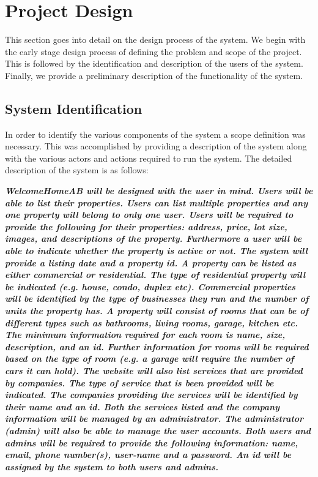 \documentclass[12pt,a4paper]{report}
\begin{document}
\section{Project Design} 
This section goes into detail on the design process of the system. We begin with the early stage design process of defining the problem and scope of the project. This is followed by the identification and description of the users of the system. Finally, we provide a preliminary description of the functionality of the system.

\subsection{System Identification}
In order to identify the various components of the system a scope definition was necessary. This was accomplished by providing a description of the system along with the various actors and actions required to run the system. The detailed description of the system is as follows:

\textbf{\textit{WelcomeHomeAB will be designed with the user in mind. Users will be able to list their properties. Users can list multiple properties and any one property will belong to only one user. Users will be required to provide the following for their properties: address, price, lot size, images, and descriptions of the property. Furthermore a user will be able to indicate whether the property is active or not. The system will provide a listing date and a property id. A property can be listed as either commercial or residential. The type of residential property will be indicated (e.g. house, condo, duplex etc). Commercial properties will be identified by the type of businesses they run and the number of units the property has. A property will consist of rooms that can be of different types such as bathrooms, living rooms, garage, kitchen etc. The minimum information required for each room is name, size, description, and an id. Further information for rooms will be required based on the type of room (e.g. a garage will require the number of cars it can hold). The website will also list services that are provided by companies. The type of service that is been provided will be indicated. The companies providing the services will be identified by their name and an id. Both the services listed and the company information will be managed by an administrator. The administrator (admin) will also be able to manage the user accounts. Both users and admins will be required to provide the following information: name, email, phone number(s), user-name and a password. An id will be assigned by the system to both users and admins.}}
\end{document}
